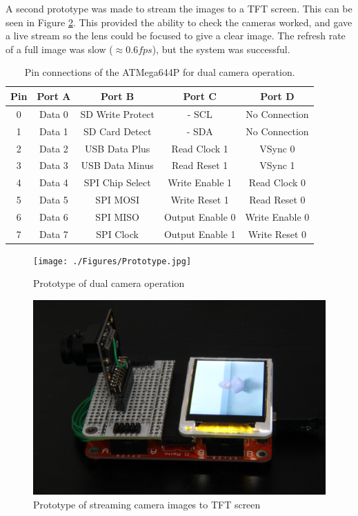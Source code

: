 A second prototype was made to stream the images to a TFT screen. This can be seen in Figure \ref{fig:Prototype:TFT}. This provided the ability to check the cameras worked, and gave a live stream so the lens could be focused to give a clear image. The refresh rate of a full image was slow ($\approx 0.6fps$), but the system was successful.

\begin{table}
\centering
\caption{Pin connections of the ATMega644P for dual camera operation.}
\label{table:644Pin}
\begin{tabular}{ccccc}\toprule
\textbf{Pin}	& 	\textbf{Port A} 	& 	\textbf{Port B} 			& 	\textbf{Port C} 				& 	\textbf{Port D} 		\\ \toprule
0	&	Data 0	&	SD Write Protect&	\itc - SCL			&	No Connection	\\ \midrule
1	&	Data 1	&	SD Card Detect	&	\itc - SDA			&	No Connection	\\ \midrule
2	&	Data 2	&	USB Data Plus	&	Read Clock 1		&	VSync 0			\\ \midrule
3	&	Data 3	&	USB Data Minus	&	Read Reset 1		&	VSync 1			\\ \midrule
4	&	Data 4	&	SPI Chip Select	&	Write Enable 1		&	Read Clock 0	\\ \midrule
5	&	Data 5	&	SPI	MOSI 		&	Write Reset 1		&	Read Reset 0	\\ \midrule
6	&	Data 6	&	SPI MISO		&	Output Enable 0		&	Write Enable 0	\\ \midrule
7	&	Data 7	&	SPI Clock		&	Output Enable 1		&	Write Reset 0	\\ \bottomrule
\end{tabular}
\end{table}

\begin{figure}
\texttt{[image: ./Figures/Prototype.jpg]}
\caption{Prototype of dual camera operation}
\label{fig:Prototype}
\end{figure}

\begin{figure}
\includegraphics[width=\textwidth]{./Figures/Camera_TFT.jpg}
\caption{Prototype of streaming camera images to TFT screen}
\label{fig:Prototype:TFT}
\end{figure}

